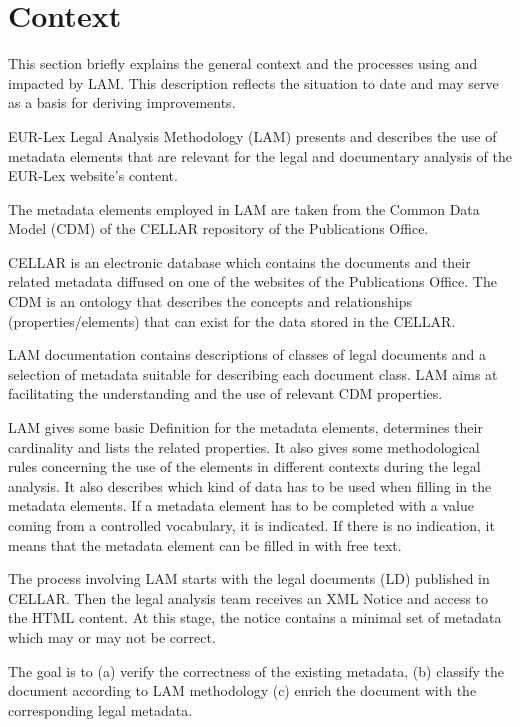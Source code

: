 \hypertarget{ariaid-title1}{%
\section{Context}\label{ariaid-title1}}

This section briefly explains the general context and the processes
using and impacted by LAM. This description reflects the situation to
date and may serve as a basis for deriving improvements.

EUR-Lex Legal Analysis Methodology (LAM) presents and describes the use
of metadata elements that are relevant for the legal and documentary
analysis of the EUR-Lex website's content.

The metadata elements employed in LAM are taken from the Common Data
Model (CDM) of the CELLAR repository of the Publications Office.

CELLAR is an electronic database which contains the documents and their
related metadata diffused on one of the websites of the Publications
Office. The CDM is an ontology that describes the concepts and
relationships (properties/elements) that can exist for the data stored
in the CELLAR.

LAM documentation contains descriptions of classes of legal documents
and a selection of metadata suitable for describing each document class.
LAM aims at facilitating the understanding and the use of relevant CDM
properties.

LAM gives some basic Definition for the metadata elements, determines
their cardinality and lists the related properties. It also gives some
methodological rules concerning the use of the elements in different
contexts during the legal analysis. It also describes which kind of data
has to be used when filling in the metadata elements. If a metadata
element has to be completed with a value coming from a controlled
vocabulary, it is indicated. If there is no indication, it means that
the metadata element can be filled in with free text.

The process involving LAM starts with the legal documents (LD) published
in CELLAR. Then the legal analysis team receives an XML Notice and
access to the HTML content. At this stage, the notice contains a minimal
set of metadata which may or may not be correct.

The goal is to (a) verify the correctness of the existing metadata, (b)
classify the document according to LAM methodology (c) enrich the
document with the corresponding legal metadata.

